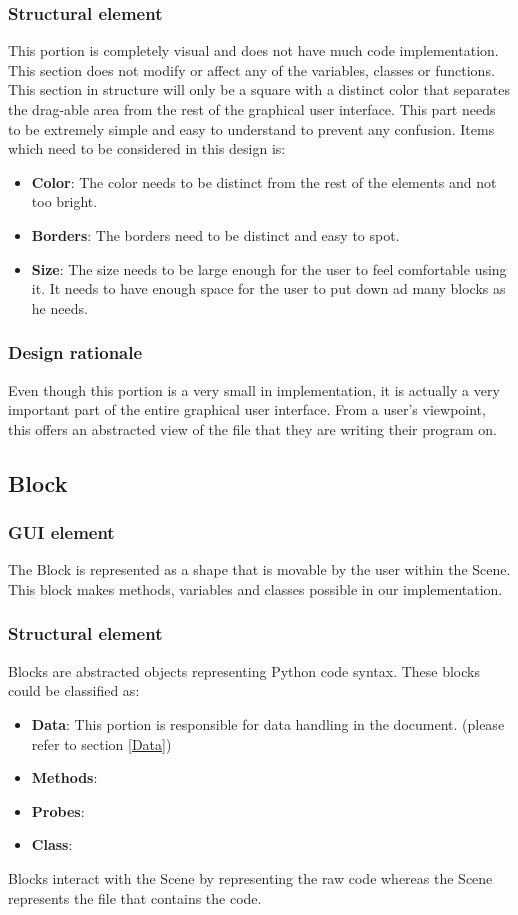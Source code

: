 \documentclass[journal,10pt,onecolumn,compsoc]{IEEEtran} \usepackage[margin=1.0in]{geometry} \usepackage{pdfpages}
\begin{document}
\subsubsection{Structural element}
\noindent This portion is completely visual and does not have much code implementation. 
This section does not modify or affect any of the variables, classes or functions.
This section in structure will only be a square with a distinct color that separates the drag-able area from the rest of the graphical user interface.
This part needs to be extremely simple and easy to understand to prevent any confusion. 
Items which need to be considered in this design is:
\begin{itemize}
	\item \textbf{Color}: The color needs to be distinct from the rest of the elements and not too bright. 
    \item \textbf{Borders}: The borders need to be distinct and easy to spot.
    \item \textbf{Size}: The size needs to be large enough for the user to feel comfortable using it. It needs to have enough space for the user to put down ad many blocks as he needs.
\end{itemize}
\subsubsection{Design rationale}
\noindent Even though this portion is a very small in implementation, it is actually a very important part of the entire graphical user interface. 
From a user's viewpoint, this offers an abstracted view of the file that they are writing their program on.
\subsection{Block}
\subsubsection{GUI element}
\noindent The Block is represented as a shape that is movable by the user within the Scene. This block makes methods, variables and classes possible in our implementation.

\subsubsection{Structural element}
\noindent Blocks are abstracted objects representing Python code syntax.
These blocks could be classified as:
\begin{itemize}
	\item \textbf{Data}: This portion is responsible for data handling in the document. (please refer to section \ref{Data})
    \item \textbf{Methods}:
    \item \textbf{Probes}:
    \item \textbf{Class}:
\end{itemize}
Blocks interact with the Scene by representing the raw code whereas the Scene represents the file that contains the code.
\end{document}
